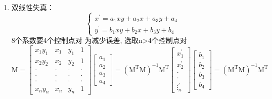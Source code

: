 \documentclass{ctexart}
\begin{document}
\begin{enumerate}
$$              \mathrm{M}\right)^{-1} \mathrm{M}^{\mathrm{T}}\left[\begin{array}{c}x_{1}^{\prime} \\ x_{2}^{\prime}
                      \\ \cdot \\ \cdot \\ \vdots \\ x_{n}^{\prime}\end{array}\right] \quad\left[\begin{array}{l}b_{1}
                      \\ b_{2} \\ b_{3}\end{array}\right]=\left(\mathrm{M}^{\mathrm{T}} \mathrm{M}\right)^{-1}
              \mathrm{M}^{\mathrm{T}}\left[\begin{array}{c}y_{1}^{\prime} \\ y_{2}^{\prime} \\ \cdot \\ \cdot \\
                      y_{n}^{\prime}\end{array}\right]$$
    \item 双线性失真：$$\left\{\begin{array}{l}x^{\prime}=a_{1} x y+a_{2} x+a_{3} y+a_{4} \\ y^{\prime}=b_{1} x y+b_{2} x+b_{3} y+b_{4}\end{array}\right.$$
          8个系数要4个控制点对 为减少误差, 选取n>4个控制点对
          $$\mathrm{M}=\left[\begin{array}{cccc}x_{1} y_{1} & x_{1} & y_{1} & 1
                      \\ x_{2} y_{2} & x_{2} & y_{2} & 1 \\ \cdot & \cdot & \cdot & \cdot \\ \cdot & \cdot & \cdot & \cdot
                      \\ \cdot & \cdot & \cdot & \cdot \\ x_{n} y_{n} & x_{n} & y_{n} &
                      1\end{array}\right]\left[\begin{array}{c}a_{1} \\ a_{2} \\ a_{3} \\ a_{4}\end{array}\right]=\left(\mathrm{M}^{\mathrm{T}}
              \mathrm{M}\right)^{-1} \mathrm{M}^{\mathrm{T}}\left[\begin{array}{c}x_{1}^{\prime} \\ x_{2}^{\prime} \\ \cdot \\ \cdot \\ \vdots_{n}^{\prime}\end{array}\right]\left[\begin{array}{c}b_{1} \\ b_{2} \\ b_{3} \\ b_{4}\end{array}\right]=\left(\mathrm{M}^{\mathrm{T}} \mathrm{M}\right)^{-1} \mathrm{M}^{\mathrm{T}}
$$
\end{enumerate}
\end{document}
